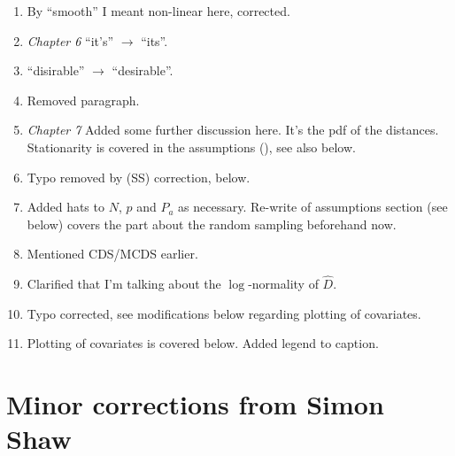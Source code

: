\begin{enumerate}
\item {} By ``smooth'' I meant non-linear here, corrected.
\item {} \textit{Chapter 6} ``it's'' $\rightarrow$ ``its''.
\item {} ``disirable'' $\rightarrow$ ``desirable''.
\item {} Removed paragraph.
\item {} \textit{Chapter 7} Added some further discussion here.  It's the pdf of the distances. Stationarity is covered in the assumptions (), see also below.
\item {} Typo removed by (SS) correction, below.
\item {} Added hats to $N$, $p$ and $P_a$ as necessary. Re-write of assumptions section (see below) covers the part about the random sampling beforehand now.
\item {} Mentioned CDS/MCDS earlier.
\item {} Clarified that I'm talking about the $\log$-normality of $\hat{D}$.
\item {} Typo corrected, see modifications below regarding plotting of covariates.
\item {} Plotting of covariates is covered below. Added legend to caption.
\end{enumerate}

\section{Minor corrections from Simon Shaw}
\label{shaw}

